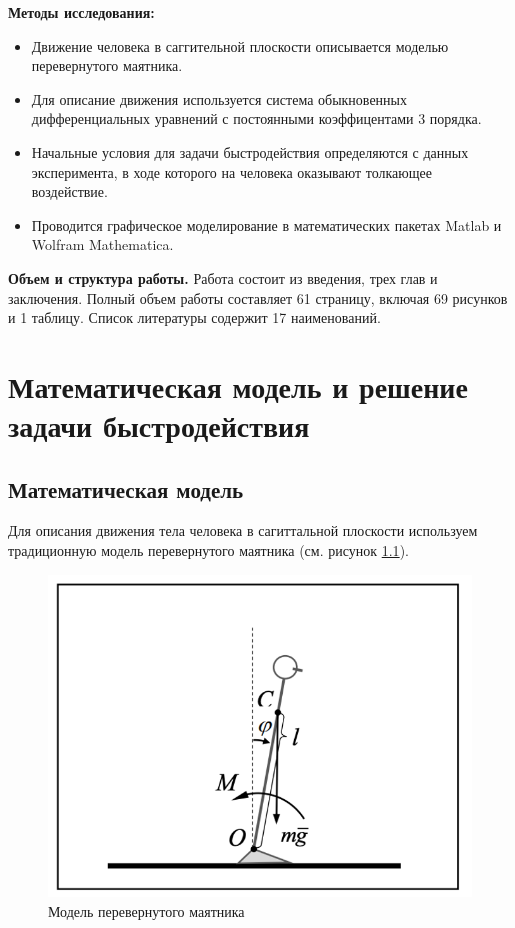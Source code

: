 \documentclass[a4paper,12pt, openany]{book}
\theoremstyle{plain} %
\theoremstyle{definition} %
\theoremstyle{remark} %
\numberwithin{equation}{chapter}
\begin{document}
{\textbf{Методы исследования:} 
\begin{itemize} 
    \item Движение человека в саггительной плоскости описывается моделью перевернутого маятника.
    \item Для описание движения используется система обыкновенных дифференциальных уравнений с постоянными коэффицентами 3 порядка.
    \item Начальные условия для задачи быстродействия определяются с данных эксперимента, в ходе которого на человека оказывают толкающее воздействие.
    \item Проводится графическое моделирование в математических пакетах Matlab и Wolfram Mathematica.
\end{itemize} 




\textbf{Объем и структура работы.} Работа состоит из введения, трех глав и заключения. Полный объем работы составляет 61 страницу, включая 69 рисунков и 1 таблицу. Список литературы содержит 17 наименований. 

\newpage

\chapter{Математическая модель и решение задачи быстродействия}
\section{Математическая модель} 
Для описания движения тела человека в сагиттальной плоскости используем традиционную модель перевернутого маятника (см. рисунок \ref{fig:pendulum}).

\begin{figure}[h!]
    \centering
    \includegraphics[width=0.9\linewidth]{pendulum.png}
    \caption{Модель перевернутого маятника}
    \label{fig:pendulum}
\end{figure}

}
\end{document}

